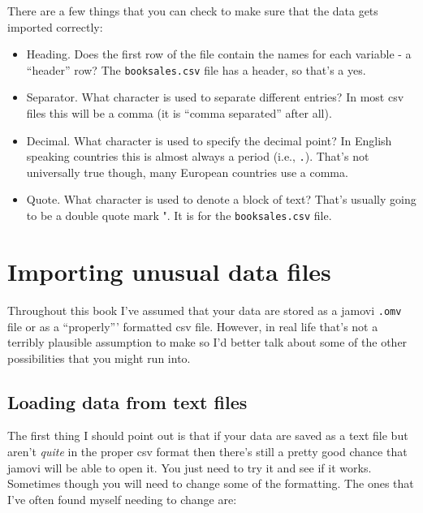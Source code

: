 \documentclass[
]{book}
\providecommand{\tightlist}{%
  \setlength{\itemsep}{0pt}\setlength{\parskip}{0pt}}
\begin{document}
There are a few things that you can check to make sure that the data gets imported correctly:

\begin{itemize}
\tightlist
\item
  Heading. Does the first row of the file contain the names for each variable - a ``header'' row? The \texttt{booksales.csv} file has a header, so that's a yes.
\item
  Separator. What character is used to separate different entries? In most csv files this will be a comma (it is ``comma separated'' after all).
\item
  Decimal. What character is used to specify the decimal point? In English speaking countries this is almost always a period (i.e., \texttt{.}). That's not universally true though, many European countries use a comma.
\item
  Quote. What character is used to denote a block of text? That's usually going to be a double quote mark ". It is for the \texttt{booksales.csv} file.
\end{itemize}

\hypertarget{importing}{%
\section{Importing unusual data files}\label{importing}}

Throughout this book I've assumed that your data are stored as a jamovi \texttt{.omv} file or as a ``properly''' formatted csv file. However, in real life that's not a terribly plausible assumption to make so I'd better talk about some of the other possibilities that you might run into.

\hypertarget{loading-data-from-text-files}{%
\subsection{Loading data from text files}\label{loading-data-from-text-files}}

The first thing I should point out is that if your data are saved as a text file but aren't \emph{quite} in the proper csv format then there's still a pretty good chance that jamovi will be able to open it. You just need to try it and see if it works. Sometimes though you will need to change some of the formatting. The ones that I've often found myself needing to change are:
\end{document}
